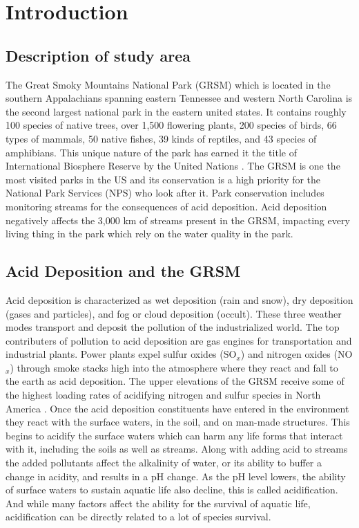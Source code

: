 \chapter{Introduction} \label{ch:intro}

\section{Description of study area}

The Great Smoky Mountains National Park (GRSM) which is located in the southern Appalachians spanning eastern Tennessee and western North Carolina is the second largest national park in the eastern united states.
It contains roughly 100 species of native trees, over 1,500 flowering plants, 200 species of birds, 66 types of mammals, 50 native fishes, 39 kinds of reptiles, and 43 species of amphibians.
This unique nature of the park has earned it the title of  International Biosphere Reserve by the United Nations \citep{NPS}.	
The GRSM is one the most visited parks in the US and its conservation is a high priority for the National Park Services (NPS) who look after it.		
Park conservation includes monitoring streams for the consequences of acid deposition.	
Acid deposition negatively affects the 3,000 km of streams present in the GRSM, impacting every living thing in the park which rely on the water quality in the park.  
	
\section{Acid Deposition and the GRSM}

Acid deposition is characterized as wet deposition (rain and snow), dry deposition (gases and particles), and fog or cloud deposition (occult).
These three weather modes transport and deposit the pollution of the industrialized world.
The top contributers of pollution to acid deposition are gas engines for transportation and industrial plants.
Power plants expel sulfur oxides (SO$_x$) and nitrogen oxides (NO$_x$) through smoke stacks high into the atmosphere where they react and fall to the earth as acid deposition.
The upper elevations of the GRSM receive some of the highest loading rates of acidifying nitrogen and sulfur species in North America \citep{johnson1992atmospheric}.  
Once the acid deposition constituents have entered in the environment they react with the surface waters, in the soil, and on man-made structures\citep{board1983acid}.  
This begins to acidify the surface waters which can harm any life forms that interact with it, including the soils as well as streams.
Along with adding acid to streams the added pollutants affect the alkalinity of water, or its ability to buffer a change in acidity,  and results in a pH change.  
As the pH level lowers, the ability of surface waters to sustain aquatic life also decline, this is called acidification. 
And while many factors affect the ability for the survival of aquatic life, acidification can be directly related to a lot of species survival.  

